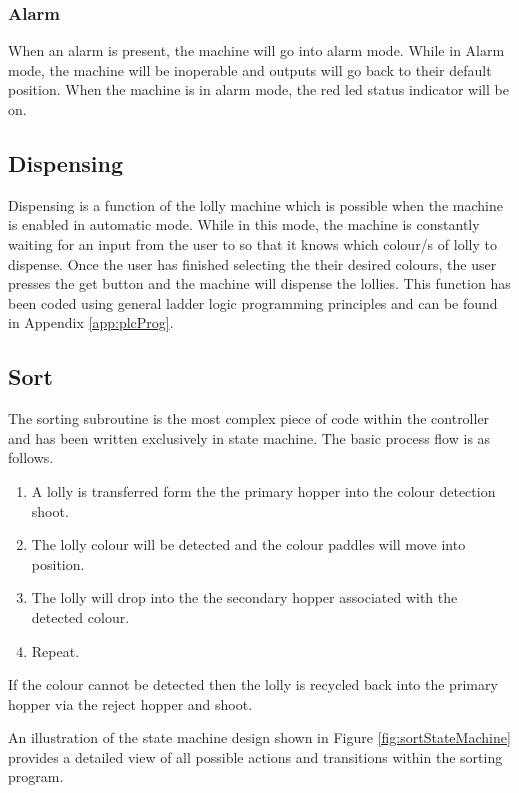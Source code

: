         \subsubsection{Alarm}
            When an alarm is present, the machine will go into alarm mode. While in Alarm mode, the machine will be inoperable and outputs will go back to their default position. When the machine is in alarm mode, the red \acrshort{led} status indicator will be on.

    \subsection{Dispensing}
        Dispensing is a function of the lolly machine which is possible when the machine is enabled in automatic mode. While in this mode, the machine is constantly waiting for an input from the user to so that it knows which colour/s of lolly to dispense. Once the user has finished selecting the their desired colours, the user presses the get button and the machine will dispense the lollies. This function has been coded using general ladder logic programming principles and can be found in Appendix \ref{app:plcProg}.
        
    \subsection{Sort}
        The sorting subroutine is the most complex piece of code within the controller and has been written exclusively in state machine. The basic process flow is as follows. 

        \begin{enumerate}
            \item A lolly is transferred form the the primary hopper into the colour detection shoot.
            \item The lolly colour will be detected and the colour paddles will move into position.
            \item The lolly will drop into the the secondary hopper associated with the detected colour.
            \item Repeat.
        \end{enumerate}

        If the colour cannot be detected then the lolly is recycled back into the primary hopper via the reject hopper and shoot. 

        An illustration of the state machine design shown in Figure \ref{fig:sortStateMachine} provides a detailed view of all possible actions and transitions within the sorting program.


